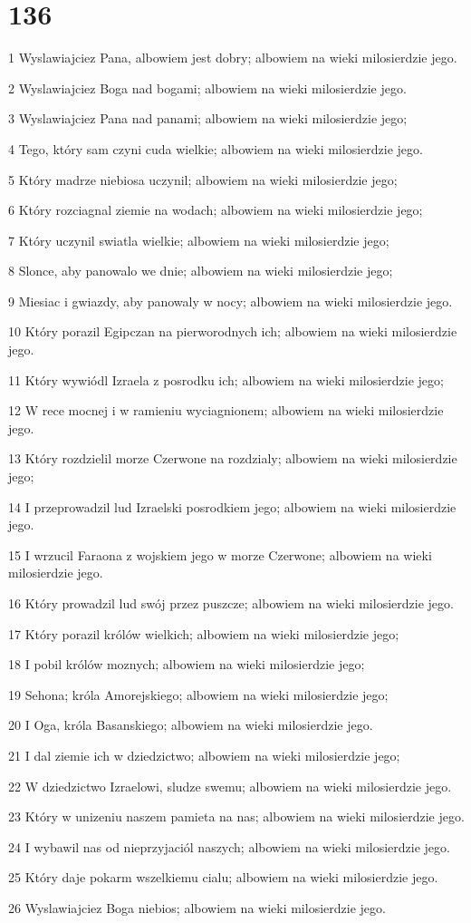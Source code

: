 \chapter{136}

\par 1 Wyslawiajciez Pana, albowiem jest dobry; albowiem na wieki milosierdzie jego.
\par 2 Wyslawiajciez Boga nad bogami; albowiem na wieki milosierdzie jego.
\par 3 Wyslawiajciez Pana nad panami; albowiem na wieki milosierdzie jego;
\par 4 Tego, który sam czyni cuda wielkie; albowiem na wieki milosierdzie jego.
\par 5 Który madrze niebiosa uczynil; albowiem na wieki milosierdzie jego;
\par 6 Który rozciagnal ziemie na wodach; albowiem na wieki milosierdzie jego;
\par 7 Który uczynil swiatla wielkie; albowiem na wieki milosierdzie jego;
\par 8 Slonce, aby panowalo we dnie; albowiem na wieki milosierdzie jego;
\par 9 Miesiac i gwiazdy, aby panowaly w nocy; albowiem na wieki milosierdzie jego.
\par 10 Który porazil Egipczan na pierworodnych ich; albowiem na wieki milosierdzie jego.
\par 11 Który wywiódl Izraela z posrodku ich; albowiem na wieki milosierdzie jego;
\par 12 W rece mocnej i w ramieniu wyciagnionem; albowiem na wieki milosierdzie jego.
\par 13 Który rozdzielil morze Czerwone na rozdzialy; albowiem na wieki milosierdzie jego;
\par 14 I przeprowadzil lud Izraelski posrodkiem jego; albowiem na wieki milosierdzie jego.
\par 15 I wrzucil Faraona z wojskiem jego w morze Czerwone; albowiem na wieki milosierdzie jego.
\par 16 Który prowadzil lud swój przez puszcze; albowiem na wieki milosierdzie jego.
\par 17 Który porazil królów wielkich; albowiem na wieki milosierdzie jego;
\par 18 I pobil królów moznych; albowiem na wieki milosierdzie jego;
\par 19 Sehona; króla Amorejskiego; albowiem na wieki milosierdzie jego;
\par 20 I Oga, króla Basanskiego; albowiem na wieki milosierdzie jego.
\par 21 I dal ziemie ich w dziedzictwo; albowiem na wieki milosierdzie jego;
\par 22 W dziedzictwo Izraelowi, sludze swemu; albowiem na wieki milosierdzie jego.
\par 23 Który w unizeniu naszem pamieta na nas; albowiem na wieki milosierdzie jego.
\par 24 I wybawil nas od nieprzyjaciól naszych; albowiem na wieki milosierdzie jego.
\par 25 Który daje pokarm wszelkiemu cialu; albowiem na wieki milosierdzie jego.
\par 26 Wyslawiajciez Boga niebios; albowiem na wieki milosierdzie jego.

